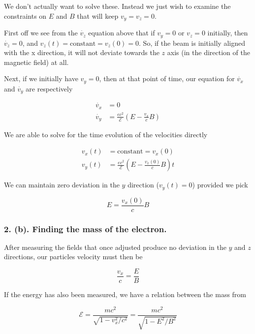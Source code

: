 We don't actually want to solve these.  Instead we just wish to examine the constraints on $E$ and $B$ that will keep $v_y = v_z = 0$.

First off we see from the $\dot{v_z}$ equation above that if $v_y = 0$ or $v_z = 0$ initially, then $\dot{v_z} = 0$, and $v_z(t) = \text{constant} = v_z(0) = 0$.  So, if the beam is initially aligned with the x direction, it will not deviate towards the $z$ axis (in the direction of the magnetic field) at all.

Next, if we initially have $v_y = 0$, then at that point of time, our equation for $\dot{v_x}$ and $\dot{v_y}$ are respectively

\begin{align}\label{eqn:relElectroDynProblemSet2:370}
\dot{v_x} &= 0 \\
\dot{v_y} &= \frac{e c^2}{\mathcal{E}} \left( E - \frac{v_x}{c} B \right) 
\end{align}

We are able to solve for the time evolution of the velocities directly

\begin{align}\label{eqn:relElectroDynProblemSet2:390}
v_x(t) &= \text{constant} = v_x(0) \\
v_y(t) &= \frac{e c^2}{\mathcal{E}} \left( E - \frac{v_x(0)}{c} B \right) t
\end{align}

We can maintain zero deviation in the $y$ direction ($v_y(t) = 0$) provided we pick

\begin{equation}\label{eqn:relElectroDynProblemSet2:410}
E = \frac{v_x(0)}{c} B
\end{equation}

\subsubsection{2. (b). Finding the mass of the electron.}

After measuring the fields that once adjusted produce no deviation in the $y$ and $z$ directions, our particles velocity must then be

\begin{equation}\label{eqn:relElectroDynProblemSet2:430}
\frac{v_x}{c} = \frac{E}{B}
\end{equation}

If the energy has also been measured, we have a relation between the mass from

\begin{equation}\label{eqn:relElectroDynProblemSet2:450}
\mathcal{E} = \frac{m c^2}{\sqrt{1 - v_x^2/c^2}} = \frac{ m c^2 }{ \sqrt{ 1 - E^2/B^2 }}
\end{equation}

